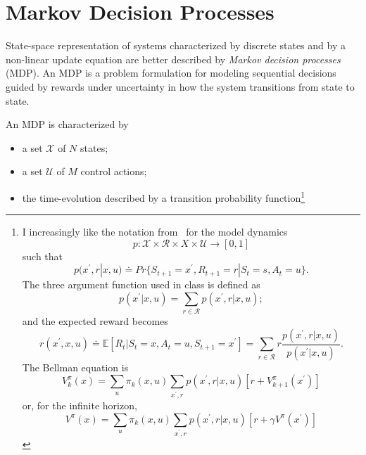 \chapter{Markov Decision Processes}
\label{chap:markov-decision-processes}

State-space representation of systems characterized by discrete states and by a non-linear update equation are better described by \emph{Markov decision processes} (MDP). An MDP is a problem formulation for modeling sequential decisions guided by rewards under uncertainty in how the system transitions from state to state.

An MDP is characterized by
\begin{itemize}
\item a set $\mathcal{X}$ of $N$ states;
\item a set $\mathcal{U}$ of $M$ control actions;
\item the time-evolution described by a transition probability function\footnote{I increasingly like the notation from~\cite[Sect.~3.1]{reinforcement-learning-sutton-barto} for the model dynamics
    \begin{equation*}
      p:\mathcal{X}\times\mathcal{R}\times{X}\times\mathcal{U} \rightarrow [0,1]
    \end{equation*}
    such that
    \begin{equation*}
      p(x^\prime,r|x,u) \doteq Pr\{S_{t+1}=x^\prime,R_{t+1}=r|S_t=s,A_t=u\}.
    \end{equation*}
    The three argument function used in class is defined as
    \begin{equation*}
      p(x^\prime|x,u) = \sum_{r\in\mathcal{R}} p(x^\prime,r|x,u);
    \end{equation*}
    and the expected reward becomes
    \begin{equation*}
      r(x^\prime,x,u) \doteq \mathbb{E}[R_t|S_t=x,A_t=u,S_{t+1}=x^\prime] = \sum_{r\in\mathcal{R}} r \frac{p(x^\prime,r|x,u)}{p(x^\prime|x,u)}.
    \end{equation*}
    The Bellman equation is
    \begin{equation*}
      V_k^\pi(x) = \sum_u \pi_k(x,u) \sum_{x^\prime,r} p(x^\prime,r|x,u) \left[r+V_{k+1}^\pi(x^\prime)\right]
    \end{equation*}
    or, for the infinite horizon,
    \begin{equation*}
      V^\pi(x) = \sum_u \pi_k(x,u) \sum_{x^\prime,r} p(x^\prime,r|x,u) \left[r+\gamma V^\pi(x^\prime)\right]
    \end{equation*}
}
\end{itemize}
